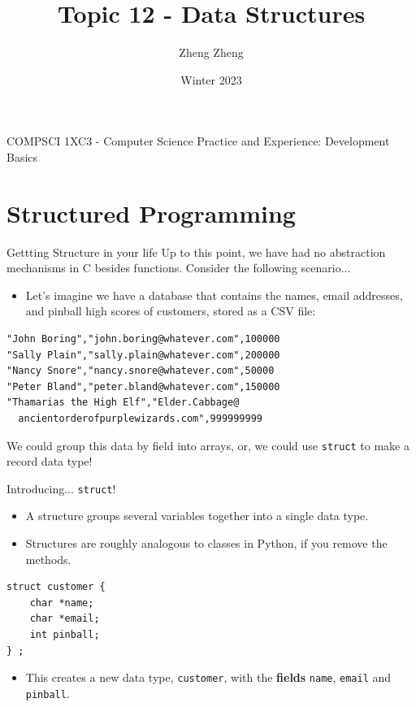\documentclass[11pt]{beamer}
\author{Zheng Zheng}
\title{Topic 12 - Data Structures}
\institute{McMaster University}
\date{Winter 2023}
\begin{document}
\begin{frame}
\center
COMPSCI 1XC3 - Computer Science Practice and Experience:
Development Basics
\titlepage
\end{frame}

\begin{frame}
\tableofcontents
\end{frame}

\section[struct]{Structured Programming}
\begin{frame}[fragile=singleslide]{Gettting Structure in your life}
Up to this point, we have had no abstraction mechanisms in C besides functions. Consider the following scenario...
\begin{itemize}
\item Let's imagine we have a database that contains the names, email addresses, and pinball high scores of customers, stored as a CSV file:
\end{itemize}
\begin{verbatim}
"John Boring","john.boring@whatever.com",100000
"Sally Plain","sally.plain@whatever.com",200000
"Nancy Snore","nancy.snore@whatever.com",50000
"Peter Bland","peter.bland@whatever.com",150000
"Thamarias the High Elf","Elder.Cabbage@
  ancientorderofpurplewizards.com",999999999
\end{verbatim}
We could group this data by field into arrays, or, we could use \texttt{struct} to make a record data type!  
\end{frame}

\begin{frame}[fragile=singleslide]{Introducing... \texttt{struct}!}
\begin{itemize}
\item A structure groups several variables together into a single data type.
\item Structures are roughly analogous to classes in Python, if you remove the methods.
\end{itemize}
\begin{lstlisting}[style=C]
struct customer {
	char *name;
	char *email;
	int pinball;
} ; 
\end{lstlisting}
\begin{itemize}
\item This creates a new data type, \texttt{customer}, with the \textbf{fields} \texttt{name}, \texttt{email} and \texttt{pinball}.
\end{itemize}
\end{frame}
\end{document}

